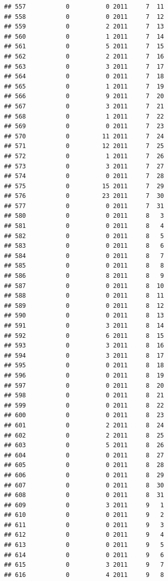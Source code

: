 \documentclass[
]{article}
\begin{document}
\begin{verbatim}
## 557           0          0 2011     7  11
## 558           0          0 2011     7  12
## 559           0          2 2011     7  13
## 560           0          1 2011     7  14
## 561           0          5 2011     7  15
## 562           0          2 2011     7  16
## 563           0          3 2011     7  17
## 564           0          0 2011     7  18
## 565           0          1 2011     7  19
## 566           0          9 2011     7  20
## 567           0          3 2011     7  21
## 568           0          1 2011     7  22
## 569           0          0 2011     7  23
## 570           0         11 2011     7  24
## 571           0         12 2011     7  25
## 572           0          1 2011     7  26
## 573           0          3 2011     7  27
## 574           0          0 2011     7  28
## 575           0         15 2011     7  29
## 576           0         23 2011     7  30
## 577           0          0 2011     7  31
## 580           0          0 2011     8   3
## 581           0          0 2011     8   4
## 582           0          0 2011     8   5
## 583           0          0 2011     8   6
## 584           0          0 2011     8   7
## 585           0          0 2011     8   8
## 586           0          8 2011     8   9
## 587           0          0 2011     8  10
## 588           0          0 2011     8  11
## 589           0          0 2011     8  12
## 590           0          0 2011     8  13
## 591           0          3 2011     8  14
## 592           0          6 2011     8  15
## 593           0          3 2011     8  16
## 594           0          3 2011     8  17
## 595           0          0 2011     8  18
## 596           0          0 2011     8  19
## 597           0          0 2011     8  20
## 598           0          0 2011     8  21
## 599           0          0 2011     8  22
## 600           0          0 2011     8  23
## 601           0          2 2011     8  24
## 602           0          2 2011     8  25
## 603           0          5 2011     8  26
## 604           0          0 2011     8  27
## 605           0          0 2011     8  28
## 606           0          0 2011     8  29
## 607           0          0 2011     8  30
## 608           0          0 2011     8  31
## 609           0          3 2011     9   1
## 610           0          0 2011     9   2
## 611           0          0 2011     9   3
## 612           0          0 2011     9   4
## 613           0          0 2011     9   5
## 614           0          0 2011     9   6
## 615           0          3 2011     9   7
## 616           0          4 2011     9   8

\end{verbatim}
\end{document}
